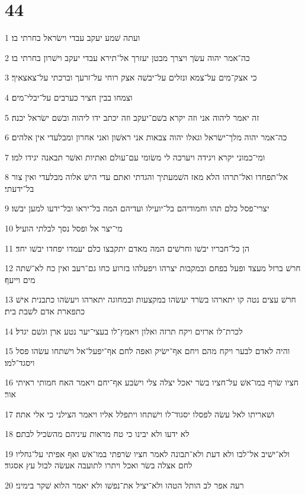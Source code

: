 \chapter{44}

\par 1 ועתה שׁמע יעקב עבדי וישׂראל בחרתי בו׃
\par 2 כה־אמר יהוה עשׂך ויצרך מבטן יעזרך אל־תירא עבדי יעקב וישׁרון בחרתי בו׃
\par 3 כי אצק־מים על־צמא ונזלים על־יבשׁה אצק רוחי על־זרעך וברכתי על־צאצאיך׃
\par 4 וצמחו בבין חציר כערבים על־יבלי־מים׃
\par 5 זה יאמר ליהוה אני וזה יקרא בשׁם־יעקב וזה יכתב ידו ליהוה ובשׁם ישׂראל יכנה׃
\par 6 כה־אמר יהוה מלך־ישׂראל וגאלו יהוה צבאות אני ראשׁון ואני אחרון ומבלעדי אין אלהים׃
\par 7 ומי־כמוני יקרא ויגידה ויערכה לי משׂומי עם־עולם ואתיות ואשׁר תבאנה יגידו למו׃
\par 8 אל־תפחדו ואל־תרהו הלא מאז השׁמעתיך והגדתי ואתם עדי הישׁ אלוה מבלעדי ואין צור בל־ידעתי׃
\par 9 יצרי־פסל כלם תהו וחמודיהם בל־יועילו ועדיהם המה בל־יראו ובל־ידעו למען יבשׁו׃
\par 10 מי־יצר אל ופסל נסך לבלתי הועיל׃
\par 11 הן כל־חבריו יבשׁו וחרשׁים המה מאדם יתקבצו כלם יעמדו יפחדו יבשׁו יחד׃
\par 12 חרשׁ ברזל מעצד ופעל בפחם ובמקבות יצרהו ויפעלהו בזרוע כחו גם־רעב ואין כח לא־שׁתה מים וייעף׃
\par 13 חרשׁ עצים נטה קו יתארהו בשׂרד יעשׂהו במקצעות ובמחוגה יתארהו ויעשׂהו כתבנית אישׁ כתפארת אדם לשׁבת בית׃
\par 14 לכרת־לו ארזים ויקח תרזה ואלון ויאמץ־לו בעצי־יער נטע ארן וגשׁם יגדל׃
\par 15 והיה לאדם לבער ויקח מהם ויחם אף־ישׂיק ואפה לחם אף־יפעל־אל וישׁתחו עשׂהו פסל ויסגד־למו׃
\par 16 חציו שׂרף במו־אשׁ על־חציו בשׂר יאכל יצלה צלי וישׂבע אף־יחם ויאמר האח חמותי ראיתי אור׃
\par 17 ושׁאריתו לאל עשׂה לפסלו יסגוד־לו וישׁתחו ויתפלל אליו ויאמר הצילני כי אלי אתה׃
\par 18 לא ידעו ולא יבינו כי טח מראות עיניהם מהשׂכיל לבתם׃
\par 19 ולא־ישׁיב אל־לבו ולא דעת ולא־תבונה לאמר חציו שׂרפתי במו־אשׁ ואף אפיתי על־גחליו לחם אצלה בשׂר ואכל ויתרו לתועבה אעשׂה לבול עץ אסגוד׃
\par 20 רעה אפר לב הותל הטהו ולא־יציל את־נפשׁו ולא יאמר הלוא שׁקר בימיני׃

